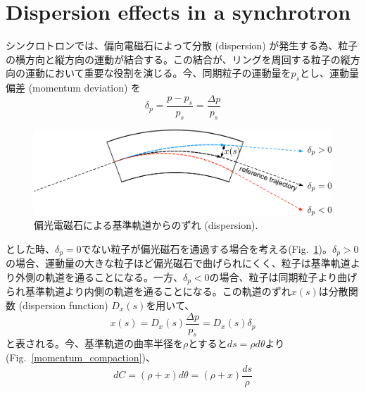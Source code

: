 \documentclass[]{jlreq}
\begin{document}
\section{Dispersion effects in a synchrotron}
シンクロトロンでは、偏向電磁石によって分散 (dispersion) が発生する為、粒子の横方向と縦方向の運動が結合する。この結合が、リングを周回する粒子の縦方向の運動において重要な役割を演じる。今、同期粒子の運動量を$p_s$とし、運動量偏差 (momentum deviation) を
%
\begin{equation}
  \delta_p = \frac{p-p_s}{p_s}=\frac{\Delta p}{p_s}
\end{equation}
%
\begin{figure}[hbt]
  \begin{center}
    \includegraphics[width=15cm,clip]{figs/dispersion.pdf}
    \caption{偏光電磁石による基準軌道からのずれ (dispersion).}
    \label{dispersion}
  \end{center}
\end{figure}
%
とした時、$\delta_p = 0$でない粒子が偏光磁石を通過する場合を考える(Fig.~\ref{dispersion})。$\delta_p >0$ の場合、運動量の大きな粒子ほど偏光磁石で曲げられにくく、粒子は基準軌道より外側の軌道を通ることになる。一方、$\delta_p<0$の場合、粒子は同期粒子より曲げられ基準軌道より内側の軌道を通ることになる。この軌道のずれ$x(s)$は分散関数 (dispersion function) $D_x(s)$を用いて、
%
\begin{equation}
  x(s) = D_x(s)\frac{\Delta p}{p_s} = D_x(s)\delta_p 
\end{equation}
%
と表される。今、基準軌道の曲率半径を$\rho$とすると$ds = \rho d\theta$より (Fig.~\ref{momentum_compaction})、
%
\begin{equation}
  dC = (\rho + x) d\theta = (\rho + x) \frac{ds}{\rho}
\end{equation}
%
\end{document}
